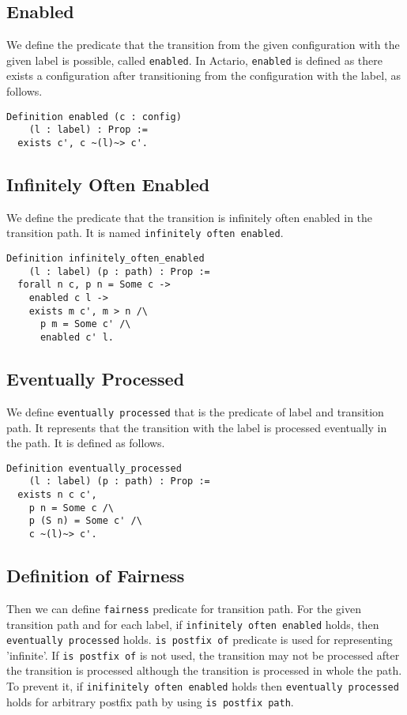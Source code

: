\subsection{Enabled}
We define the predicate that the transition from the given configuration with the given label is possible, called \texttt{enabled}.
In Actario, \texttt{enabled} is defined as there exists a configuration after transitioning from the configuration with the label, as follows.

\begin{lstlisting}
Definition enabled (c : config)
    (l : label) : Prop :=
  exists c', c ~(l)~> c'.
\end{lstlisting}

\subsection{Infinitely Often Enabled}
We define the predicate that the transition is infinitely often enabled in the transition path.
It is named \texttt{infinitely often enabled}.

\begin{lstlisting}
Definition infinitely_often_enabled
    (l : label) (p : path) : Prop :=
  forall n c, p n = Some c ->
    enabled c l ->
    exists m c', m > n /\
      p m = Some c' /\
      enabled c' l.
\end{lstlisting}


\subsection{Eventually Processed}
We define \texttt{eventually processed} that is the predicate of label and transition path.
It represents that the transition with the label is processed eventually in the path.
It is defined as follows.

\begin{lstlisting}
Definition eventually_processed
    (l : label) (p : path) : Prop :=
  exists n c c',
    p n = Some c /\
    p (S n) = Some c' /\
    c ~(l)~> c'.
\end{lstlisting}


\subsection{Definition of Fairness}
Then we can define \texttt{fairness} predicate for transition path.
For the given transition path and for each label, if \texttt{infinitely often enabled} holds, then \texttt{eventually processed} holds.
\texttt{is postfix of} predicate is used for representing 'infinite'.
If \texttt{is postfix of} is not used, the transition may not be processed after the transition is processed although the transition is processed in whole the path.
To prevent it, if \texttt{inifinitely often enabled} holds then \texttt{eventually processed} holds for arbitrary postfix path by using \texttt{is postfix path}.

